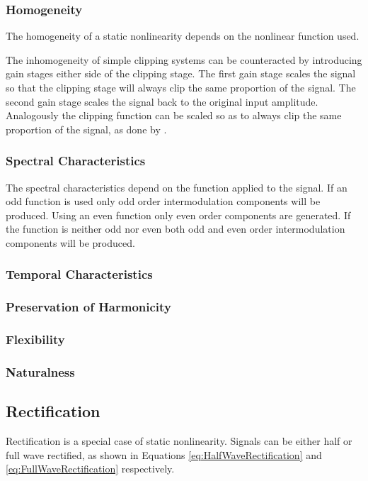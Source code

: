 		\subsubsection*{Homogeneity}
			The homogeneity of a static nonlinearity depends on the nonlinear function used. 

			The inhomogeneity of simple clipping systems can be counteracted by introducing gain stages either
			side of the clipping stage. The first gain stage scales the signal so that the clipping stage will
			always clip the same proportion of the signal. The second gain stage scales the signal back to the
			original input amplitude. Analogously the clipping function can be scaled so as to always clip the
			same proportion of the signal, as done by \citet{deman2014adaptive}.

		\subsubsection*{Spectral Characteristics}
			The spectral characteristics depend on the function applied to the signal. If an odd function is
			used only odd order intermodulation components will be produced. Using an even function only even
			order components are generated. If the function is neither odd nor even both odd and even order
			intermodulation components will be produced.

		\subsubsection*{Temporal Characteristics}
		\subsubsection*{Preservation of Harmonicity}
		\subsubsection*{Flexibility}
		\subsubsection*{Naturalness}

	\subsection{Rectification}
	\label{sec:Excitation-Rectification}
		Rectification is a special case of static nonlinearity. Signals can be either half or full wave rectified,
		as shown in Equations \ref{eq:HalfWaveRectification} and \ref{eq:FullWaveRectification} respectively.

